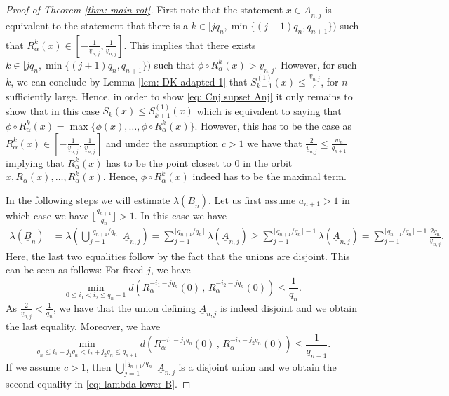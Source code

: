 \documentclass[11pt]{amsart}
\theoremstyle{definition}
\numberwithin{equation}{section}
\begin{document}
\begin{proof}[Proof of Theorem \ref{thm: main rot}]
First note that the statement $ x\in \underline{A}_{n,j}$ is equivalent to the statement that there is a $ k\in  [j q_n,\min \{(j+1)q_n, q_{n+1}\})$ such that
$R_{\alpha}^k(x)\in [-\frac{1}{\underline{v}_{n,j}}, \frac{1}{\underline{v}_{n,j}}]$. This implies that there exists $k\in  [jq_n,\min \{(j+1)q_n, q_{n+1}\})$ such that 
$\phi\circ R_{\alpha}^k(x)>\underline{v}_{n,j}$.
However, for such $k$, we can conclude by Lemma \ref{lem: DK adapted 1}
that $S_{k+1}^{(1)}(x)\leq  \frac{\underline{v}_{n,j}}{c}$, 
for $n$ sufficiently large.
Hence, in order to show \eqref{eq: Cnj supset Anj} it only remains to show that in this case $S_k(x)\leq S_{k+1}^{(1)}(x)$ which is equivalent to saying that $\phi\circ R_{\alpha}^k(x)=\max\{\phi(x),\ldots, \phi\circ R_{\alpha}^k(x)\}$. However, this has to be the case as $R_{\alpha}^k(x)\in [-\frac{1}{\underline{v}_{n,j}}, \frac{1}{\underline{v}_{n,j}}]$ and under the assumption $c>1$ we have that $\frac{2}{\underline{v}_{n,j}}\leq \frac{w_n}{q_{n+1}}$ implying that $R_{\alpha}^k(x)$ has to be the point closest to $0$ in the orbit $x,R_{\alpha}(x),\ldots, R_{\alpha}^k(x)$. Hence, $\phi\circ R_{\alpha}^k(x)$ indeed has to be the maximal term. 
\newline


In the following steps we will estimate $\lambda(\underline{B}_n)$. Let us first assume $a_{n+1}>1$ in which case we have $\lfloor \frac{q_{n+1}}{q_n}\rfloor>1$. 
In this case we have 
\begin{align}
 \lambda(\underline{B}_n)
 &=\lambda\left(\bigcup_{j=1}^{\lfloor q_{n+1}/q_n\rfloor}\underline{A}_{n,j}\right)
 =\sum_{j=1}^{\lfloor q_{n+1}/q_n\rfloor}\lambda\left(\underline{A}_{n,j}\right)
 \geq \sum_{j=1}^{\lfloor q_{n+1}/q_n\rfloor-1}\lambda\left(\underline{A}_{n,j}\right)
 =\sum_{j=1}^{\lfloor q_{n+1}/q_n\rfloor-1} \frac{ 2q_n}{\underline{v}_{n,j}}.\label{eq: lambda lower B}
\end{align}
Here, the last two equalities follow by the fact that the unions are disjoint. This can be seen as follows: 
For fixed $j$, we have
$$\min_{0\leq i_1<i_2\leq q_n-1} d(R_{\alpha}^{-i_1-jq_n}(0)\, ,\, R_{\alpha}^{-i_2-jq_n}(0))\leq \frac{1}{q_n}.$$ 
As $\frac{2}{\underline{v}_{n,j}}< \frac{1}{q_n}$, we have that the union defining $\underline{A}_{n,j}$ is indeed disjoint and we obtain the last equality. 
Moreover, we have 
$$\min_{q_n\leq i_1+j_1 q_n<i_2+j_2 q_n\leq q_{n+1}}d(R_{\alpha}^{-i_1-j_1q_n}(0)\, ,\, R_{\alpha}^{-i_2-j_2q_n}(0))\leq \frac{1}{q_{n+1}}.$$ 
If we assume $c>1$, then $\bigcup_{j=1}^{\lfloor q_{n+1}/q_n\rfloor}\underline{A}_{n,j}$ is a disjoint union and we obtain the second equality in \eqref{eq: lambda lower B}.



\end{proof}
\end{document}
